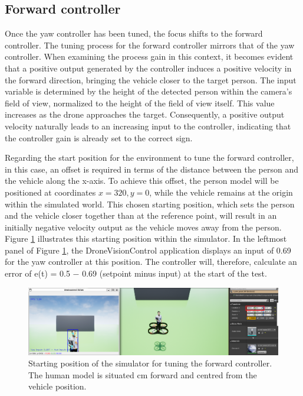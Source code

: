 \subsection{Forward controller}

Once the yaw controller has been tuned, the focus shifts to the forward controller. The tuning process for the forward controller mirrors that of the yaw controller. When examining the process gain in this context, it becomes evident that a positive output generated by the controller induces a positive velocity in the forward direction, bringing the vehicle closer to the target person. The input variable is determined by the height of the detected person within the camera's field of view, normalized to the height of the field of view itself. This value increases as the drone approaches the target. Consequently, a positive output velocity naturally leads to an increasing input to the controller, indicating that the controller gain is already set to the correct sign.

Regarding the start position for the environment to tune the forward controller, in this case, an offset is required in terms of the distance between the person and the vehicle along the x-axis. To achieve this offset, the person model will be positioned at coordinates $x=320, y=0$, while the vehicle remains at the origin within the simulated world. This chosen starting position, which sets the person and the vehicle closer together than at the reference point, will result in an initially negative velocity output as the vehicle moves away from the person. Figure \ref{fig:tune-ref-pos-fwd} illustrates this starting position within the simulator. In the leftmost panel of Figure \ref{fig:tune-ref-pos-fwd}, the DroneVisionControl application displays an input of 0.69 for the yaw controller at this position. The controller will, therefore, calculate an error of e(t) = 0.5 − 0.69 (setpoint minus input) at the start of the test.

\begin{figure}[H]
  \centering
  \includegraphics[width=\textwidth, keepaspectratio]{img/pid-3/tune-ref-pos-fwd.png}
  \caption{Starting position of the simulator for tuning the forward controller. The human model is situated \unit[420]{cm} forward and centred from the vehicle position.}\label{fig:tune-ref-pos-fwd}
\end{figure}

